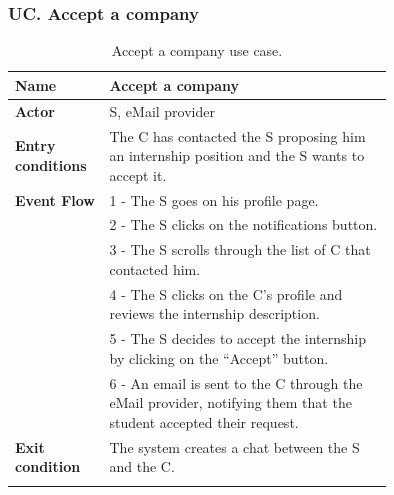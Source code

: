 \subsubsection*{UC\cuc . Accept a company}
\begin{center}
    \begin{longtable}{|l|p{0.75\linewidth}|}
        \hline
        \textbf{Name}               & Accept a company\\
        \hline
        \textbf{Actor}              & S, eMail provider\\
        \hline
        \textbf{Entry conditions}   & The C has contacted the S proposing him an internship position and the S wants to accept it.\\
        \hline
        \textbf{Event Flow}         & 1 - The S goes on his profile page. \\
        & 2 - The S clicks on the notifications button. \\
        & 3 - The S scrolls through the list of C that contacted him. \\
        & 4 - The S clicks on the C’s profile and reviews the internship description. \\
        & 5 - The S decides to accept the internship by clicking on the “Accept” button. \\
        & 6 - An email is sent to the C through the eMail provider, notifying them that the student accepted their request. \\
        \hline
        \textbf{Exit condition}   & The system creates a chat between the S and the C. \\       
        \hline
        \caption{Accept a company use case.}
        \label{tab: accept_company_use_case}
    \end{longtable}
\end{center}


